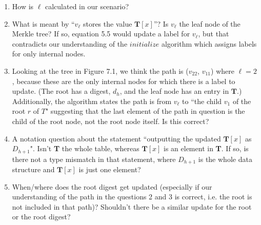 \documentclass[11pt, letterpaper, oneside]{article}
\begin{document}
\begin{enumerate}
\item How is  $\ell$ calculated in our scenario?

\item What is meant by ``$v_{\ell}$ stores the value $\textbf{T}[x]$''? Is $v_{\ell}$ the leaf node of the Merkle tree?  If so, equation 5.5 would update a label for $v_{\ell}$, but that contradicts our understanding of the $initialize$ algorithm which assigns labels for only internal nodes.  


\item Looking at the tree in Figure 7.1, we think the path is ($v_{22}$, $v_{11}$) where $\ell = 2$, because these are the only internal nodes for which there is a label to update.  (The root has a digest, $d_{h}$, and the leaf node has an entry in $\textbf{T}$.)  Additionally, the algorithm states the path is from $v_{\ell}$ to ``the child $v_{1}$ of the root $r$ of $T$" suggesting that the last element of the path in question is the child of the root node, not the root node itself. Is this correct?

\item A notation question about the statement ``outputting the updated $\textbf{T}[x]$ as $D_{h + 1}$".  Isn't \textbf{T} the whole table, whereas $\textbf{T}[x]$ is an element in \textbf{T}.  If so, is there not a type mismatch in that statement, where $D_{h + 1}$ is the whole data structure and $\textbf{T}[x]$ is just one element?

\item When/where does the root digest get updated (especially if our understanding of the path in the questions 2 and 3 is correct, i.e. the root is not included in that path)?  Shouldn't there be a similar update for the root or the root digest?


\end{enumerate}

	
\end{document}

